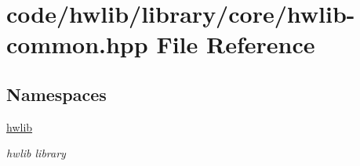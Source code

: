 \hypertarget{hwlib-common_8hpp}{}\section{code/hwlib/library/core/hwlib-\/common.hpp File Reference}
\label{hwlib-common_8hpp}
\subsection*{Namespaces}
\begin{DoxyCompactItemize}
\item 
 \hyperlink{namespacehwlib}{hwlib}
\begin{DoxyCompactList}\small\item\em hwlib library \end{DoxyCompactList}\end{DoxyCompactItemize}
